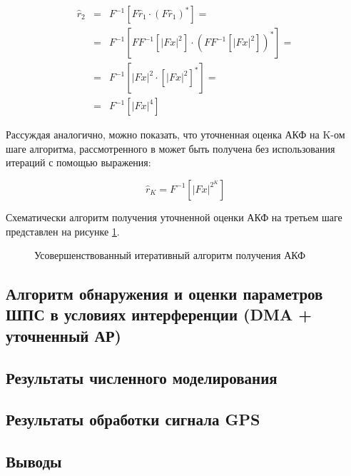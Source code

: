 \begin{center}
\begin{eqnarray}
	\label{eq:akf_2}
	\hat{r}_2 & = & F^{-1}\left[ F \hat{r}_1 \cdot (F \hat{r}_1)^* \right] = \nonumber \\
		& = & F^{-1}	\left[ 
				FF^{-1} \left[
						\left| Fx \right| ^2
					\right]
						\cdot \left( FF^{-1} \left[ \left| Fx \right| ^2 \right]
					\right) ^*
			\right] = \nonumber \\
		& = & F^{-1} \left[ \left| Fx \right| ^2 \cdot \left[ \left| Fx \right| ^2 \right] ^* \right] =  \nonumber \\
		& = & F^{-1} \left[ \left| Fx \right| ^4 \right]
\end{eqnarray}
\end{center}

Рассуждая аналогично, можно показать, что уточненная оценка АКФ на K-ом шаге алгоритма, рассмотренного в \cite{ostanin_akf}
может быть получена без использования итераций с помощью выражения:

\begin{center}
\begin{equation}
	\label{eq:akf_3}
	\hat{r}_K = F^{-1}\left[ \left| Fx \right| ^{2^K} \right]
\end{equation}
\end{center}

Схематически алгоритм получения уточненной оценки АКФ на третьем шаге представлен на рисунке \ref{pic:akf_pic}.

\begin{figure}[H]
	\center{}
	\caption{Усовершенствованный итеративный алгоритм получения АКФ}
	\label{pic:akf_pic}
\end{figure}


\subsection{Алгоритм обнаружения и оценки параметров ШПС в условиях интерференции (DMA + уточненный АР)}
\subsection{Результаты численного моделирования}
\subsection{Результаты обработки сигнала GPS}

\subsection*{Выводы}

\newpage
